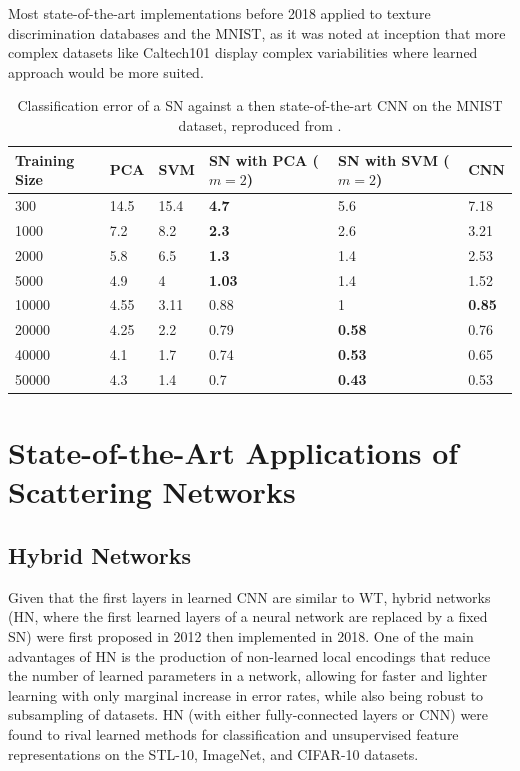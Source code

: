 \documentclass[runningheads]{llncs}
\begin{document}
Most state-of-the-art implementations before 2018 applied to texture discrimination databases\cite{textureKTH}\cite{textureUIC}\cite{textureUMD} and the MNIST, as it was noted at inception that more complex datasets like Caltech101\cite{caltech} display complex variabilities where learned approach would be more suited\cite{bruna2012invariant}.
\begin{table}\centering
\caption{Classification error of a SN against a then state-of-the-art CNN\cite{lecun} on the MNIST dataset, reproduced from \cite{bruna2012invariant}.}\label{tab2}
\begin{tabular}{| p{2cm} | p{1cm} | p{1cm} | p{3.2cm} | p{3.2cm} | p{1cm} |}
\hline
Training Size & PCA & SVM & SN with PCA ($m=2$) & SN with SVM ($m=2$) & CNN \\
\hline
300 & 14.5 & 15.4 & \textbf{4.7} & 5.6 & 7.18 \\
1000 & 7.2 & 8.2 & \textbf{2.3} & 2.6 & 3.21 \\
2000 & 5.8 & 6.5 & \textbf{1.3} & 1.4 & 2.53 \\
5000 & 4.9 & 4 & \textbf{1.03} & 1.4 & 1.52 \\
10000 & 4.55 & 3.11 & 0.88 & 1 & \textbf{0.85} \\
20000 & 4.25 & 2.2 & 0.79 & \textbf{0.58} & 0.76 \\
40000 & 4.1 & 1.7 & 0.74 & \textbf{0.53} & 0.65 \\
50000 & 4.3 & 1.4 & 0.7 & \textbf{0.43} & 0.53 \\
\hline
\end{tabular}
\end{table}

\section{State-of-the-Art Applications of Scattering Networks}

\subsection{Hybrid Networks}

Given that the first layers in learned CNN are similar to WT\cite{mallatlecture}, hybrid networks (HN, where the first learned layers of a neural network are replaced by a fixed SN) were first proposed in 2012\cite{bruna2012invariant} then implemented in 2018\cite{oyallon}. One of the main advantages of HN is the production of non-learned local encodings that reduce the number of learned parameters in a network, allowing for faster and lighter learning with only marginal increase in error rates, while also being robust to subsampling of datasets. HN (with either fully-connected layers or CNN) were found to rival learned methods\cite{oyallon} for classification and unsupervised feature representations on the STL-10\cite{stl}, ImageNet\cite{imagenet}, and CIFAR-10\cite{cifar} datasets.
\end{document}
